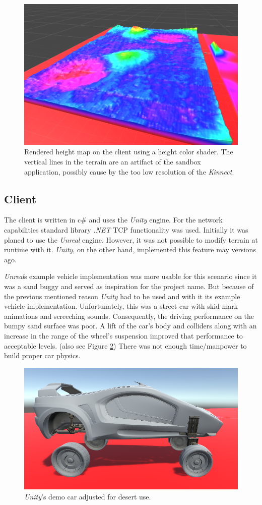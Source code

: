 \documentclass[12pt,a4paper,twoside,titlepage,headsepline,numbers=noenddot,listof=totoc,index=totoc,bibliography=totoc]{scrartcl}
\theoremstyle{break}
\begin{document}
\begin{figure}
	\centering
	\includegraphics[width=0.8\linewidth]{figures/sandboxHeightShade}
	\caption{Rendered height map on the client using a height color shader. The vertical lines in the terrain are an artifact of the sandbox application, possibly cause by the too low resolution of the \textit{Kinnect}.}
	\label{fig:sandboxheightshade}
\end{figure}

\subsection{Client}
The client is written in c\# and uses the \textit{Unity} engine. For the network capabilities standard library \textit{.NET} TCP functionality was used. Initially it was planed to use the \textit{Unreal} engine. However, it was not possible to modify terrain at runtime with it. \textit{Unity}, on the other hand, implemented this feature may versions ago. 

\textit{Unreal}s example vehicle implementation was more usable for this scenario since it was a sand buggy and served as inspiration for the project name. But because of the previous mentioned reason \textit{Unity} had to be used and with it its example vehicle implementation. Unfortunately, this was a street car with skid mark animations and screeching sounds. Consequently, the driving performance on the bumpy sand surface was poor. A lift of the car's body and colliders along with an increase in the range of the wheel's suspension improved that performance to acceptable levels. (also see Figure \ref{fig:streetcarbuggy}) There was not enough time/manpower to build proper car physics.   

\begin{figure}
	\centering
	\includegraphics[width=0.7\linewidth]{figures/streetcarbuggy}
	\caption{\textit{Unity}'s demo car adjusted for desert use.}
	\label{fig:streetcarbuggy}
\end{figure}
\end{document}
